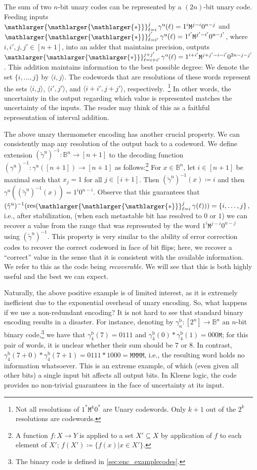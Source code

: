 \documentclass[9pt,journal,compsoc]{IEEEtran}
\theoremstyle{remark}
\DeclareMathOperator{\res}{res}
\newcommand{\bigstarr}{\mathop{\raisebox{-.7pt}{\ensuremath{\mathlarger{\mathlarger{\mathlarger{*}}}}}}}
\newcommand{\mfu}{\mathtt{M}}
\newcommand{\IB}{\mathbb{B}}
\newcommand{\ang}[1]{\langle{#1}\rangle}
\newcommand{\intvl}[1]{\ang{#1}}
\newcommand{\gBin}[1]{\gamma_{#1}^{\operatorname{b}}}
\newcommand{\gUnary}[1]{\gamma_{#1}^{\operatorname{u}}}
\newcommand{\gtUnary}{(\tilde{\gamma}^{\operatorname{u}})^{-1}}
\begin{document}
The sum of two $n$-bit unary codes can be represented by a $(2n)$-bit unary code.
Feeding inputs $\bigstarr_{\ell=i}^{j}\gUnary{}(\ell)=1^i\mfu^{j-i}0^{n-j}$ and
  $\bigstarr_{\ell=i'}^{j'}\gUnary{}(\ell)=1^{i'}\mfu^{j'-i'}0^{n-j'}$, where
  $i,i',j,j'\in [n+1]$, into an adder that maintains precision, outputs
  $\bigstarr_{\ell=i+i'}^{j+j'}\gUnary{}(\ell)=1^{i+i'}\mfu^{j+j'-i-i'}0^{2n-j-j'}$.
This addition maintains information to the best possible degree:
We denote the set $\{i,\ldots,j\}$ by $\intvl{i,j}$.
The codewords that are resolutions of these words represent the sets
  $\intvl{i,j}$, $\intvl{i',j'}$, and $\intvl{i+i',j+j'}$, 
  respectively.~\footnote{Not all resolutions of $1^*\mfu^k 0^*$ are 
  Unary codewords. Only $k+1$ out of the $2^k$ resolutions are codewords.}
In other words, the uncertainty in the output regarding which value is
  represented matches the uncertainty of the inputs. The reader may think of this
  as a faithful representation of interval addition.
  
The above unary thermometer encoding has another crucial property.
We can consistently map any resolution of the output back to a codeword.
We define extension $\gtUnary:\IB^n\rightarrow [n+1]$ to the decoding function 
  $(\gUnary{})^{-1}:\gUnary{}([n+1])\rightarrow [n+1]$
  as follows:\footnote{
  A function $f\colon X\rightarrow Y$ is applied to a set $X'\subseteq X$ by
  application of $f$ to each element of $X'$; $f(X')\coloneqq\{f(x)|x\in X'\}$.}
For $x\in \IB^n$, let $i\in [n+1]$ be maximal such that $x_j=1$ for all $j\in [i+1]$.
Then $\gtUnary(x)\coloneqq i$ and then $
  \gUnary{}(\gtUnary(x))=1^i0^{n-i}$.
Observe that this guarantees that
$\gtUnary(\res(\bigstarr_{\ell=i}^{j}\gamma(\ell)))=\{i,\ldots,j\}$, i.e.,
  after stabilization, %
  (when each metastable bit has resolved to $0$ or $1$) %
  we can recover a value from the range that was represented
  by the word $1^i\mfu^{j-i}0^{n-j}$ using $\gtUnary$.
This property is very similar to the ability of error correction codes to recover the correct
  codeword in face of bit flips; here, we recover a ``correct'' value in the sense
  that it is consistent with the available information.
We refer to this as the code being \emph{recoverable}.
We will see that this is both highly useful and the best we can expect.

Naturally, the above positive example is of limited interest, as it is extremely
  inefficient due to the exponential overhead of unary encoding.
So, what happens if we use a non-redundant encoding? It is not hard to see that standard binary
  encoding results in a disaster.
For instance, denoting by $\gBin{n}\colon [2^n]\to\IB^n$ an $n$-bit binary 
  code,\footnote{The binary code is defined in \cref{sec:enc_examplecodes}.}
  we have that $\gBin{4}(7)=0111$ and $\gBin{4}(0)*\gBin{4}(1)=000\mfu$;
  for this pair of words, it is unclear whether their sum should be $7$ or $8$.
In contrast, $\gBin{4}(7+0)*\gBin{4}(7+1)=0111*1000=\mfu\mfu\mfu\mfu$, i.e., the resulting
  word holds no information whatsoever.
This is an extreme example, of which
  (even given all other bits) a single input bit affects all output bits.
In Kleene logic, the code provides no non-trivial guarantees in the face of uncertainty
  at its input.
\end{document}
